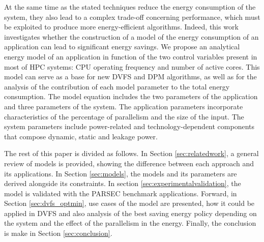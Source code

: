 At the same time as the stated techniques reduce the energy consumption of the system, they also lead to a complex trade-off concerning performance, which must be exploited to produce more energy-efficient algorithms.
Indeed, this work investigates whether the construction of a model of the energy consumption of an application can lead to significant energy savings. We propose an analytical energy model of an application in function of the two control variables present in most of HPC systems: CPU operating frequency and number of active cores. This model can serve as a base for new DVFS and DPM algorithms, as well as for the analysis of the contribution of each model parameter to the total energy consumption. The model equation includes the two parameters of the application and three parameters of the system. The application parameters incorporate characteristics of the percentage of parallelism and the size of the input. The system parameters include power-related and technology-dependent components that compose dynamic, static and leakage power.

The rest of this paper is divided as follows. In Section \ref{sec:relatedwork}, a general review of models is provided, showing the difference between each approach and its applications. In Section \ref{sec:models}, the models and its parameters are derived alongside its constraints. In section \ref{sec:experimentalvalidation}, the model is validated with the PARSEC benchmark applications. Forward, in Section \ref{sec:dvfs_optmin}, use cases of the model are presented, how it could be applied in DVFS and also analysis of the best saving energy policy depending on the system and the effect of the parallelism in the energy. Finally, the conclusion is make in Section \ref{sec:conclusion}.


